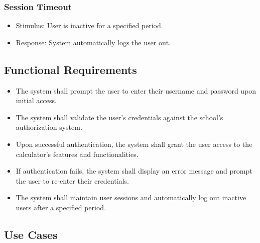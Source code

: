 \documentclass{scrreprt}
\begin{document}
\subsubsection*{Session Timeout}
\begin{itemize}
    \item Stimulus: User is inactive for a specified period.
    \item Response: System automatically logs the user out.
\end{itemize}

\subsection{Functional Requirements}

\begin{itemize}
    \item \freqid The system shall prompt the user to enter their username and password upon initial access.
    \item \freqid The system shall validate the user's credentials against the school's authorization system.
    \item \freqid Upon successful authentication, the system shall grant the user access to the calculator's features and functionalities.
    \item \freqid If authentication fails, the system shall display an error message and prompt the user to re-enter their credentials.
    \item \freqid The system shall maintain user sessions and automatically log out inactive users after a specified period.
\end{itemize}

\subsection{Use Cases}
\end{document}
